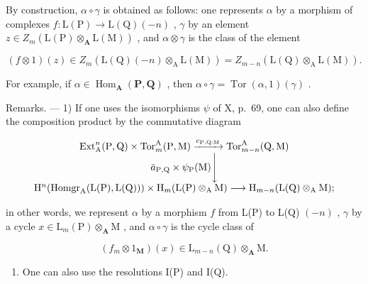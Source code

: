 By construction, \(\alpha \circ \gamma\) is obtained as follows: one represents \(\alpha\) by a morphism of complexes \(f: \mathrm{L}(\mathrm{P}) \to \mathrm{L}(\mathrm{Q})(-n)\) , \(\gamma\) by an element \(z \in Z_m(\mathrm{L}(\mathrm{P}) \otimes_{\mathbf{A}} \mathrm{L}(\mathrm{M}))\) , and \(\alpha \otimes \gamma\) is the class of the element

\[
(f \otimes 1) (z) \in Z _ {m} (\mathrm{L} (\mathrm{Q}) (- n) \otimes_ {\mathrm{A}} \mathrm{L} (\mathrm{M})) = Z _ {m - n} (\mathrm{L} (\mathrm{Q}) \otimes_ {\mathrm{A}} \mathrm{L} (\mathrm{M})).
\]

For example, if \(\alpha \in \operatorname{Hom}_{\mathbf{A}}(\mathbf{P},\mathbf{Q})\) , then \(\alpha \circ \gamma = \operatorname{Tor}(\alpha,1)(\gamma)\) .

Remarks. --- 1) If one uses the isomorphisms \(\psi\) of X, p.~69, one can also define the composition product by the commutative diagram

\[
\begin{array}{c} \operatorname{Ext} _ {\mathrm{A}} ^ {n} (\mathrm{P}, \mathrm{Q}) \times \operatorname{Tor} _ {m} ^ {\mathrm{A}} (\mathrm{P}, \mathrm{M}) \xrightarrow {c _ {\mathrm{P} , \mathrm{Q} : \mathrm{M}}} \operatorname{Tor} _ {m - n} ^ {\mathrm{A}} (\mathrm{Q}, \mathrm{M}) \\ \bar {a} _ {\mathrm{P}, \mathrm{Q}} \times \psi_ {\mathrm{P}} (\mathrm{M}) \Biggl \downarrow \\ \mathrm{H} ^ {n} (\operatorname{Homgr} _ {\mathrm{A}} (\mathrm{L} (\mathrm{P}), \mathrm{L} (\mathrm{Q}))) \times \mathrm{H} _ {m} (\mathrm{L} (\mathrm{P}) \otimes_ {\mathrm{A}} \mathrm{M}) \longrightarrow \mathrm{H} _ {m - n} (\mathrm{L} (\mathrm{Q}) \otimes_ {\mathrm{A}} \mathrm{M}); \end{array}
\]

in other words, we represent \(\alpha\) by a morphism \(f\) from L(P) to L(Q) \((-n)\) , \(\gamma\) by a cycle \(x \in \mathrm{L}_{m}(\mathrm{P}) \otimes_{\mathbf{A}} \mathrm{M}\) , and \(\alpha \circ \gamma\) is the cycle class of

\[
\left(f _ {m} \otimes 1 _ {\mathbf {M}}\right) (x) \in \mathrm{L} _ {m - n} (\mathrm{Q}) \otimes_ {\mathbf {A}} \mathrm{M}.
\]

\begin{enumerate}
\def\labelenumi{\arabic{enumi})}
\setcounter{enumi}{1}
\tightlist
\item
  One can also use the resolutions I(P) and I(Q).
\end{enumerate}

